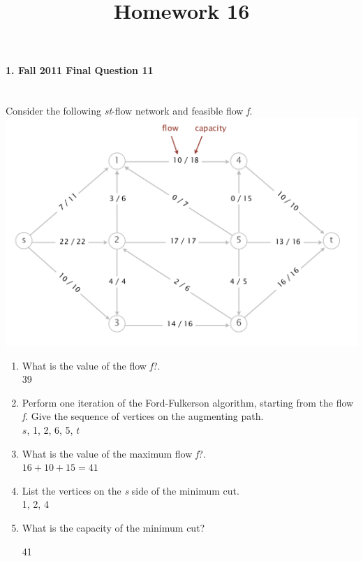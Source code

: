 \documentclass{article}
\begin{document}
\title{Homework 16}
\date{}
\maketitle


\paragraph{\Large 1. Fall 2011 Final Question 11}\mbox{}\\
Consider the following \textit{st}-flow network and feasible flow \textit{f}.\\
\includegraphics[]{fin-f11-11.png}\\
\begin{enumerate}
\renewcommand{\theenumi}{\Alph{enumi}}
	\item What is the value of the flow \textit{f}?.\\
	
	39

	\item Perform one iteration of the Ford-Fulkerson algorithm, starting from the flow \textit{f}. Give the sequence of vertices on the augmenting path.\\

	$s$, 1, 2, 6, 5, $t$  

	\item What is the value of the maximum flow \textit{f}?.\\
	
	$16 + 10 + 15 = 41$

	\item List the vertices on the \textit{s} side of the minimum cut.\\

	1, 2, 4

	\item What is the capacity of the minimum cut?

	41

\end{enumerate}
\end{document}
